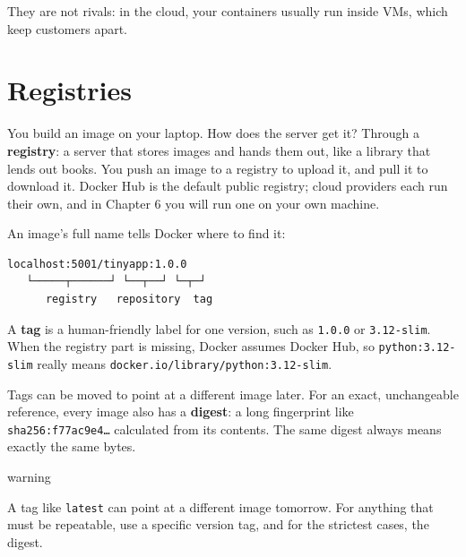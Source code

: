 They are not rivals: in the cloud, your containers usually run inside VMs, which keep customers apart.

\section{Registries}\label{02-containers-shipping-the-whole-kitchen:registries}

You build an image on your laptop. How does the server get it? Through a \textbf{registry}: a server that stores images and hands them out, like a library that lends out books. You push an image to a registry to upload it, and pull it to download it. Docker Hub is the default public registry; cloud providers each run their own, and in Chapter 6 you will run one on your own machine.


An image's full name tells Docker where to find it:

\begin{codeblock}
\begin{Verbatim}[breaklines=false, fontsize=\fontsize{8.8}{8.68}\selectfont, fontfamily=diagrammono, formatcom=\diagramlines]
   localhost:5001/tinyapp:1.0.0
   └─────┬──────┘ └──┬──┘ └─┬─┘
      registry   repository  tag
\end{Verbatim}
\end{codeblock}

A \textbf{tag} is a human-friendly label for one version, such as \texttt{1.0.0} or \texttt{3.12-slim}. When the registry part is missing, Docker assumes Docker Hub, so \texttt{python:3.12-slim} really means \texttt{docker.}\allowbreak{}\texttt{io/}\allowbreak{}\texttt{library/}\allowbreak{}\texttt{python:}\allowbreak{}\texttt{3.}\allowbreak{}\texttt{12-}\allowbreak{}\texttt{slim}.

Tags can be moved to point at a different image later. For an exact, unchangeable reference, every image also has a \textbf{digest}: a long fingerprint like \texttt{sha256:f77ac9e4…} calculated from its contents. The same digest always means exactly the same bytes.

\begin{callout}{warning}

A tag like \texttt{latest} can point at a different image tomorrow. For anything that must be repeatable, use a specific version tag, and for the strictest cases, the digest.

\end{callout}


